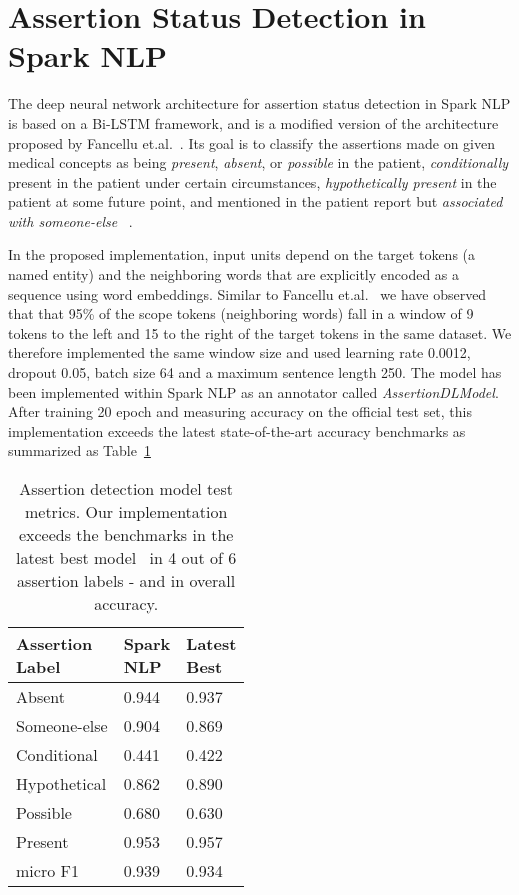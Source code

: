 \documentclass[letterpaper]{article} \usepackage{aaai21}  \usepackage{times}  \usepackage{helvet} \usepackage{courier}  \usepackage[hyphens]{url}  \usepackage{graphicx} \urlstyle{rm} \def\UrlFont{\rm}  \usepackage{natbib}  \usepackage{caption} \frenchspacing  \setlength{\pdfpagewidth}{8.5in}  \setlength{\pdfpageheight}{11in}  \usepackage{lscape}
\begin{document}
\begin{table}[htbp!]
{\begin{tabular}{llll}
\end{tabular}
}
\end{table}

\section{Assertion Status Detection in Spark NLP}
\label{sec:AssertionDL}

The deep neural network architecture for assertion status detection in Spark NLP is based on a Bi-LSTM framework, and is a modified version of the architecture proposed by Fancellu et.al.~\cite{fancellu2016neural}. Its goal is to classify the assertions made on given medical concepts as being \textit{present}, \textit{absent}, or \textit{possible} in the patient, \textit{conditionally} present in the patient under certain circumstances, \textit{hypothetically present} in the patient at some future point, and mentioned in the patient report but \textit{associated with someone-else} ~\cite{uzuner20112010}. 

In the proposed implementation, input units depend on the target tokens (a named entity) and the neighboring words that are explicitly encoded as a sequence using word embeddings. Similar to Fancellu et.al.~\cite{fancellu2016neural} we have observed that that 95\% of the scope tokens (neighboring words) fall in a window of 9 tokens to the left and 15 to the right of the target tokens in the same dataset. We therefore implemented the same window size and used learning rate 0.0012, dropout 0.05, batch size 64 and a maximum sentence length 250. The model has been implemented within Spark NLP as an annotator called \textit{AssertionDLModel}. After training 20 epoch and measuring accuracy on the official test set, this implementation exceeds the latest state-of-the-art accuracy benchmarks as summarized as Table~\ref{tab:assertion_metrics}

\begin{table}[htb!]
\caption{Assertion detection model test metrics. Our implementation exceeds the benchmarks in the latest best model~\cite{uzuner20112010} in 4 out of 6 assertion labels - and in overall accuracy.}
\centering
\label{tab:assertion_metrics}
\begin{tabular}{lll}
\hline
\thead{Assertion\\ Label} & \thead{Spark\\ NLP} & \thead{Latest\\ Best} \\\hline
Absent & 0.944 & 0.937 \\
Someone-else & 0.904 & 0.869 \\
Conditional & 0.441 & 0.422 \\
Hypothetical & 0.862 & 0.890 \\
Possible & 0.680 & 0.630 \\
Present & 0.953 & 0.957 \\\hline
micro F1 & 0.939 & 0.934\\
\hline
\end{tabular}
\end{table}
\end{document}
